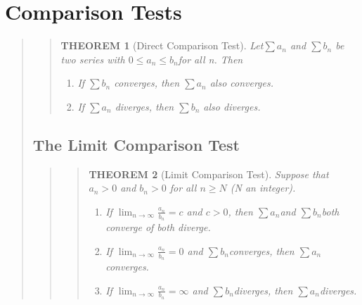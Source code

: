 \documentclass{report}
\newtheorem{theorem}{THEOREM}
\begin{document}

\section{Comparison Tests }
\begin{quote}

	\begin{quote}
	\begin{theorem}[Direct Comparison Test]
		\mbox{}\par
		Let$\sum a_n$ and $\sum b_n $ be two series with $0\leq a_n \leq b_n$for all n. Then
		\begin{enumerate}
			\item If $\sum b_n$ converges, then $\sum a_n$ also converges.
			\item If $\sum a_n$ diverges, then $\sum b_n$ also diverges.
		\end{enumerate}
	\end{theorem}
	\end{quote}

	\subsection{The Limit Comparison Test}
	\begin{quote}
		
		\begin{quote}
			\begin{theorem}[Limit Comparison Test]
				Suppose that $a_n > 0$ and $b_n > 0$ for all $n \geq N$ (N an integer).
				\begin{enumerate}
					\item If $\lim_{n\to\infty} \frac{a_n}{b_n} = c$       and $c>0$, then $\sum a_n$and $\sum b_n$both converge of both diverge.
					\item If $\lim_{n\to\infty} \frac{a_n}{b_n} = 0$       and $\sum b_n$converges, then $\sum a_n$converges.
					\item If $\lim_{n\to\infty} \frac{a_n}{b_n} = \infty$  and $\sum b_n$diverges, then $\sum a_n$diverges.
				\end{enumerate}
			\end{theorem}
		\end{quote}

	\end{quote}

\end{quote}
\end{document}
